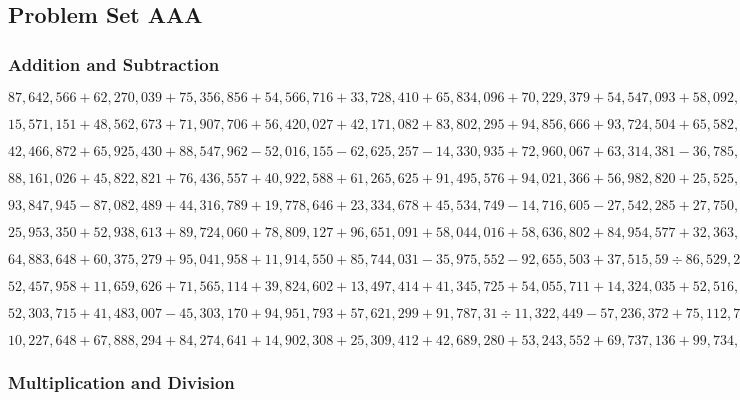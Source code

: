\hypertarget{problem-set-aaa-7}{%
\subsection{Problem Set AAA}\label{problem-set-aaa-7}}

\hypertarget{addition-and-subtraction-363}{%
\subsubsection{Addition and
Subtraction}\label{addition-and-subtraction-363}}

\(87,642,566+62,270,039+75,356,856+54,566,716+33,728,410+65,834,096+70,229,379+54,547,093+58,092,249+66,111,029\)

\(15,571,151+48,562,673+71,907,706+56,420,027+42,171,082+83,802,295+94,856,666+93,724,504+65,582,403+94,873,967\)

\(42,466,872+65,925,430+88,547,962-52,016,155-62,625,257-14,330,935+72,960,067+63,314,381-36,785,041+33,297,188\)

\(88,161,026+45,822,821+76,436,557+40,922,588+61,265,625+91,495,576+94,021,366+56,982,820+25,525,376+65,715,522\)

\(93,847,945-87,082,489+44,316,789+19,778,646+23,334,678+45,534,749-14,716,605-27,542,285+27,750,023-33,331,888\)

\(25,953,350+52,938,613+89,724,060+78,809,127+96,651,091+58,044,016+58,636,802+84,954,577+32,363,054+65,312,919\)

\(64,883,648+60,375,279+95,041,958+11,914,550+85,744,031-35,975,552-92,655,503+37,515,59÷86,529,280-69,959,961\)

\(52,457,958+11,659,626+71,565,114+39,824,602+13,497,414+41,345,725+54,055,711+14,324,035+52,516,904+18,547,249\)

\(52,303,715+41,483,007-45,303,170+94,951,793+57,621,299+91,787,31÷11,322,449-57,236,372+75,112,721-82,484,277\)

\(10,227,648+67,888,294+84,274,641+14,902,308+25,309,412+42,689,280+53,243,552+69,737,136+99,734,199+57,377,271\)

\hypertarget{multiplication-and-division-362}{%
\subsubsection{Multiplication and
Division}\label{multiplication-and-division-362}}

